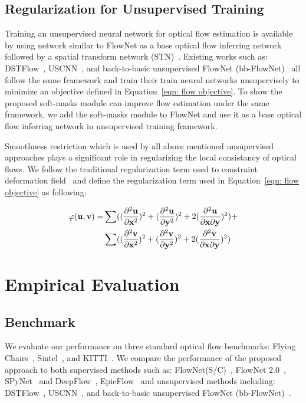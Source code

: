 \documentclass[10pt,twocolumn,letterpaper]{article}
\begin{document}
\subsection{Regularization for Unsupervised Training}
Training an unsupervised neural network for optical flow estimation is available by using network similar to FlowNet as a base optical flow inferring network followed by a spatial transform network (STN)~\cite{jaderberg2015spatial}. Existing works such as: DSTFlow~\cite{ren2017unsupervised}, USCNN~\cite{ahmadi2016unsupervised}, and back-to-basic unsupervised FlowNet (bb-FlowNet)~\cite{DBLP:journals/corr/YuHD16} all follow the same framework and train  their train neural networks unsupervisely to minimize an objective defined in Equation~\ref{eqn: flow objective}.  To show the proposed soft-masks module can improve flow estimation under the same framework, we add the soft-masks module to FlowNet and use it as a base optical flow inferring network in unsupervised training framework.

Smoothness restriction which is used by all above mentioned unsupervised approaches plays a significant role in regularizing the local consistancy of optical flows.  We follow the traditional regularization term used to constraint deformation field~\cite{rohlfing2003volume}\cite{ashburner1999nonlinear} and define the regularization term used in Equation~\ref{eqn: flow objective} as following:

\begin{align*}
\varphi(\bold{u}, \bold{v}) = & \sum ((\frac{\partial^2\bold{u}}{\partial \bold{x}^2})^2+(\frac{\partial^2\bold{u}}{\partial \bold{y}^2})^2+2(\frac{\partial^2\bold{u}}{\partial \bold{x} \partial \bold{y}})^2) + \\ 
& \sum ((\frac{\partial^2\bold{v}}{\partial \bold{x}^2})^2+(\frac{\partial^2\bold{v}}{\partial \bold{y}^2})^2+2(\frac{\partial^2\bold{v}}{\partial \bold{x} \partial \bold{y}})^2)
\end{align*}


\section{Empirical Evaluation}
\label{sec: evaluation}
\subsection{Benchmark}
We evaluate our performance on three standard optical flow benchmarks: Flying Chairs~\cite{7410673},  Sintel~\cite{Butler:ECCV:2012}, and KITTI~\cite{geiger2012we}. We compare the performance of the proposed approach to both supervised methods such as: FlowNet(S/C)~\cite{7410673}, FlowNet 2.0~\cite{Ilg_2017_CVPR}, SPyNet~\cite{Ranjan_2017_CVPR} and DeepFlow~\cite{weinzaepfel2013deepflow}, EpicFlow~\cite{revaud2015epicflow} and unsupervised methods including: DSTFlow~\cite{ren2017unsupervised}, USCNN~\cite{ahmadi2016unsupervised}, and back-to-basic unsupervised FlowNet (bb-FlowNet)~\cite{DBLP:journals/corr/YuHD16}. 
\end{document}
